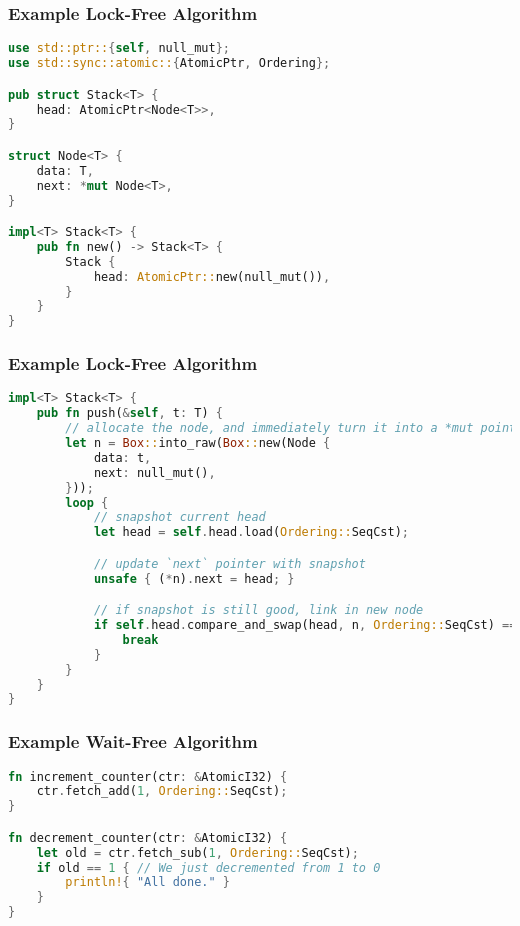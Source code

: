 \begin{frame}[fragile]
\frametitle{Example Lock-Free Algorithm}

\begin{lstlisting}[language=Rust]
use std::ptr::{self, null_mut};
use std::sync::atomic::{AtomicPtr, Ordering};

pub struct Stack<T> {
    head: AtomicPtr<Node<T>>,
}

struct Node<T> {
    data: T,
    next: *mut Node<T>,
}

impl<T> Stack<T> {
    pub fn new() -> Stack<T> {
        Stack {
            head: AtomicPtr::new(null_mut()),
        }
    }
}
\end{lstlisting}
\end{frame}


\begin{frame}[fragile]
\frametitle{Example Lock-Free Algorithm}

\begin{lstlisting}[language=Rust]
impl<T> Stack<T> {
    pub fn push(&self, t: T) {
        // allocate the node, and immediately turn it into a *mut pointer
        let n = Box::into_raw(Box::new(Node {
            data: t,
            next: null_mut(),
        }));
        loop {
            // snapshot current head
            let head = self.head.load(Ordering::SeqCst);

            // update `next` pointer with snapshot
            unsafe { (*n).next = head; }

            // if snapshot is still good, link in new node
            if self.head.compare_and_swap(head, n, Ordering::SeqCst) == head {
                break
            }
        }
    }
}
\end{lstlisting}


\end{frame}

\begin{frame}[fragile]
\frametitle{Example Wait-Free Algorithm}

\begin{lstlisting}[language=Rust]
fn increment_counter(ctr: &AtomicI32) {
    ctr.fetch_add(1, Ordering::SeqCst);
}

fn decrement_counter(ctr: &AtomicI32) {
    let old = ctr.fetch_sub(1, Ordering::SeqCst);
    if old == 1 { // We just decremented from 1 to 0
        println!{ "All done." }
    }
}
\end{lstlisting}


\end{frame}


